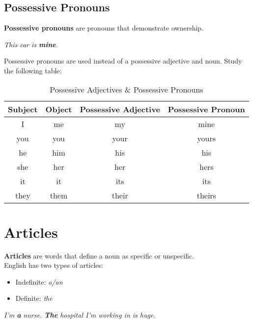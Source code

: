 \documentclass[hidelinks,10pt,a4paper]{article}
\begin{document}
\subsection{Possessive Pronouns}
\textbf{Possessive pronouns} are pronouns that demonstrate ownership.
\begin{center}
\textit{This car is \textbf{mine}.}
\end{center}
\newpage
Possessive pronouns are used instead of a possessive adjective and noun. Study the following table:
\begin{table}[h]
\begin{center}
\begin{tabular}{|c|c|c|c|}
		\hline
		\textbf{Subject} & \textbf{Object} & \textbf{Possessive Adjective} & \textbf{Possessive Pronoun}\\ \hline
		I & me & my & mine \\ \hline
		you & you & your & yours \\ \hline
		he & him & his & his \\ \hline
		she & her & her & hers \\ \hline
		it & it & its & its \\ \hline
		they & them & their & theirs\\ \hline
\end{tabular}
\end{center}
\caption{Possessive Adjectives \& Possessive Pronouns} \label{tab:nouns6}
\end{table}

\section{Articles}
\textbf{Articles} are words that define a noun as specific or unspecific.\\
English has two types of articles:
\begin{itemize}
		\item Indefinite: \textit{a/an}
		\item Definite: \textit{the}
\end{itemize}
\begin{center}
\textit{I'm \textbf{a} nurse. \textbf{The} hospital I'm working in is huge.}
\end{center}
\end{document}
